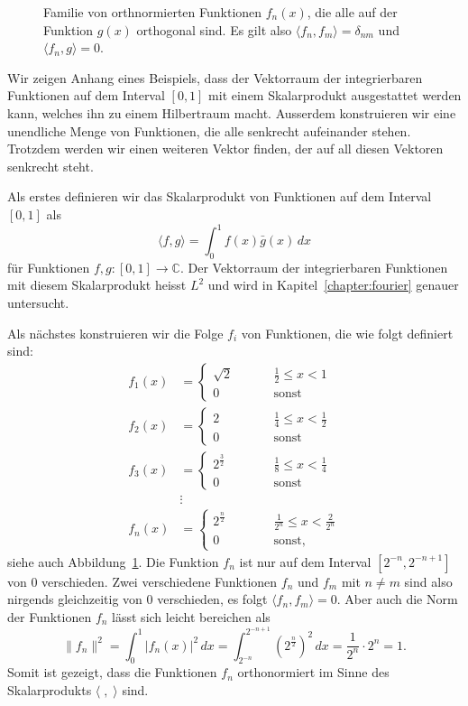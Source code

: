 \begin{beispiel}
\begin{figure}
\caption{Familie von orthnormierten Funktionen $f_n(x)$, die alle auf der
Funktion $g(x)$ orthogonal sind.
Es gilt also $\langle f_n,f_m\rangle = \delta_{nm}$ und
$\langle f_n,g\rangle=0$.
\label{l2orth}}
\end{figure}
Wir zeigen Anhang eines Beispiels, dass der Vektorraum  der integrierbaren
Funktionen auf dem Interval $[0,1]$ mit einem Skalarprodukt
ausgestattet werden kann, welches ihn zu einem Hilbertraum macht.
Ausserdem konstruieren wir eine unendliche Menge von Funktionen, die alle
senkrecht aufeinander stehen.
Trotzdem werden wir einen weiteren Vektor finden, der auf all diesen
Vektoren senkrecht steht.

Als erstes definieren wir das Skalarprodukt von Funktionen auf dem
Interval $[0,1]$ als
\[
\langle f, g\rangle
=
\int_0^1 f(x) \bar{g}(x)\,dx
\]
für Funktionen $f,g\colon [0,1]\to\mathbb C$.
Der Vektorraum der integrierbaren Funktionen mit diesem Skalarprodukt
heisst $L^2$ und wird in Kapitel~\ref{chapter:fourier} genauer untersucht.

Als nächstes konstruieren wir die Folge $f_i$ von Funktionen, die wie
folgt definiert sind:
\begin{align*}
f_1(x) &= \begin{cases}
\sqrt{2}&\qquad \frac12 \le x < 1\\
0\phantom{000}&\qquad\text{sonst}
\end{cases}
\\
f_2(x) &= \begin{cases}
2&\qquad \frac14 \le x < \frac12\\
0\phantom{000}&\qquad\text{sonst}
\end{cases}
\\
f_3(x) &= \begin{cases}
2^{\frac32}&\qquad \frac18 \le x < \frac14\\
0\phantom{000}&\qquad\text{sonst}
\end{cases}
\\
&\vdots
\\
f_n(x) &= \begin{cases}
2^{\frac{n}2}&\qquad \frac1{2^n} \le x < \frac2{2^n}\\
0\phantom{000}&\qquad\text{sonst,}
\end{cases}
\end{align*}
siehe auch Abbildung~\ref{l2orth}.
Die Funktion $f_n$ ist nur auf dem Interval $[2^{-n},2^{-n+1}]$ von
$0$ verschieden.
Zwei verschiedene Funktionen $f_n$ und $f_m$ mit $n\ne m$ sind also
nirgends gleichzeitig von $0$ verschieden, es folgt
$\langle f_n,f_m\rangle =0$.
Aber auch die Norm der Funktionen $f_n$ lässt sich leicht bereichen
als
\[
\|f_n\|^2
=
\int_0^1 |f_n(x)|^2\,dx
=
\int_{2^{-n}}^{2^{-n+1}} (2^{\frac{n}2})^2 \,dx
=
\frac1{2^n}\cdot 2^n = 1.
\]
Somit ist gezeigt, dass die Funktionen $f_n$ orthonormiert im Sinne des
Skalarprodukts $\langle\;,\;\rangle$ sind.


\end{beispiel}
